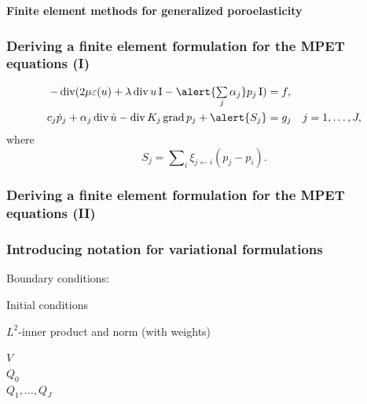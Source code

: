 \documentclass[10pt, mathserif, aspectratio=169, t]{beamer}
\DeclareMathOperator{\Div}{\mathrm{div}}
\DeclareMathOperator{\Grad}{\mathrm{grad}}
\newcommand{\foralls}{\forall \;}
\newcommand{\mysection}[1]{\begin{frame} \begin{center} \vspace{3em} \textbf{#1} \end{center} \end{frame}}
\DeclareMathOperator{\ssum}{\textstyle \sum}
\begin{document}

\mysection{Finite element methods for generalized poroelasticity}

\begin{frame}
  \frametitle{Deriving a finite element formulation for the MPET equations (I)}
  \begin{align*}
    - \Div (2 \mu \varepsilon(u) + \lambda \Div u \, \mathrm{I} - \alert{\ssum_{j} \alpha_j} p_j \, \mathrm{I} ) &= f, \\
    c_{j} \dot{p}_{j} + \alpha_{j} \Div \dot{u} - \Div K_{j} \Grad p_{j} + \alert{S_j} &= g_{j} \quad j = 1, \dots, J,
  \end{align*}
  where
  \begin{equation*}
    S_{j} =  \ssum_{i} \xi_{j \leftarrow i} (p_{j} - p_{i}).
  \end{equation*}
\end{frame}

\begin{frame}
  \frametitle{Deriving a finite element formulation for the MPET equations (II)}
\end{frame}

\begin{frame}
\frametitle{Introducing notation for variational formulations}

Boundary conditions:

\bigskip
\bigskip

Initial conditions

\bigskip
\bigskip

$L^2$-inner product and norm (with weights)

\bigskip
\bigskip

$V$ \\
\medskip
$Q_0$ \\
\medskip
$Q_1, \dots, Q_J$

\end{frame}
\end{document}
